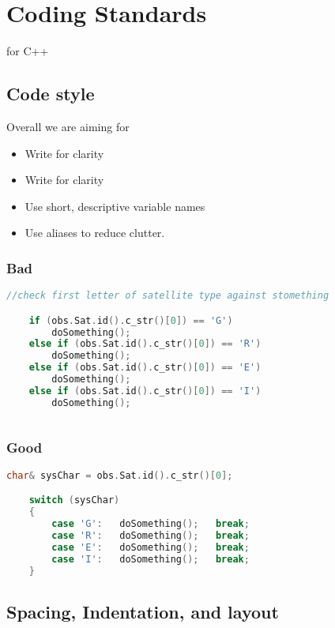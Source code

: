 \chapter{Coding Standards}
\label{ch:coding_standards}

 for C++

\section{Code style}
Overall we are aiming for
\begin{itemize}
	\item  Write for clarity
	\item  Write for clarity
	\item  Use short, descriptive variable names
	\item  Use aliases to reduce clutter.
\end{itemize}

\subsection{Bad}
\begin{lstlisting}[language=c++]
    //check first letter of satellite type against stomething

    if (obs.Sat.id().c_str()[0]) == 'G') 
        doSomething(); 
    else if (obs.Sat.id().c_str()[0]) == 'R')
        doSomething();
    else if (obs.Sat.id().c_str()[0]) == 'E')
        doSomething();
    else if (obs.Sat.id().c_str()[0]) == 'I')
        doSomething();
        
\end{lstlisting}

\subsection{Good}

\begin{lstlisting}[language=c++]
    char& sysChar = obs.Sat.id().c_str()[0];

    switch (sysChar)
    {
        case 'G':   doSomething();   break;
        case 'R':   doSomething();   break;
        case 'E':   doSomething();   break;
        case 'I':   doSomething();   break;
    }
\end{lstlisting}


\section{Spacing, Indentation, and layout}

